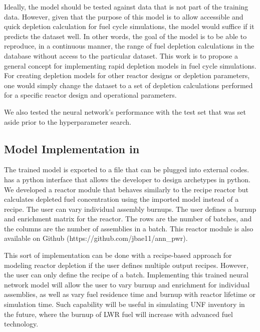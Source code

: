 Ideally, the model should be tested against data
that is not part of the training data. However, given
that the purpose of this model is to allow accessible and
quick depletion calculation for
fuel cycle simulations, the model would suffice if
it predicts the dataset well. In other words, the
goal of the model is to be able to reproduce,
in a continuous manner, the range of fuel depletion
calculations in the database without access to the particular dataset.
This work
is to propose a general concept for implementing
rapid depletion models in fuel cycle simulations.
For creating depletion models for other reactor designs or depletion parameters,
one would simply change the dataset to a set of depletion calculations performed
for a specific reactor design and operational parameters.

We also tested the neural network's performance with the
test set that was set aside prior to the hyperparameter search.



\subsection{Model Implementation in \Cyclus}

The trained model is exported to a file
that can be plugged into external codes. \Cyclus
has a python interface that allows the developer
to design archetypes in python. We developed a reactor
module that behaves similarly to the recipe reactor
but calculates depleted fuel concentration using the
imported model instead of a recipe. The user can vary
individual assembly burnups. The user defines a burnup
and enrichment
matrix for the reactor. The rows are the number
of batches, and the columns are the number of
assemblies in a batch. This reactor module is also
available on Github 
(https://github.com/jbae11/ann\_pwr).

This sort of implementation can be done with
a recipe-based approach for modeling reactor depletion
if the user defines multiple
output recipes. However, the user can only define
the recipe of a batch.
Implementing this trained neural network model will allow the user to vary
burnup and enrichment for individual assemblies, as well
as vary fuel residence time and burnup with reactor
lifetime or simulation time. Such capability will be
useful in simulating \gls{UNF} inventory in the future,
where the burnup of \gls{LWR} fuel will increase
with advanced fuel technology.